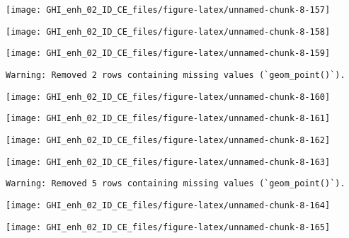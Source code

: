 \documentclass[
  10pt,
  a4paper,oneside]{article}
\begin{document}
\begin{center}\texttt{[image: GHI\_enh\_02\_ID\_CE\_files/figure-latex/unnamed-chunk-8-157]} \end{center}

\begin{center}\texttt{[image: GHI\_enh\_02\_ID\_CE\_files/figure-latex/unnamed-chunk-8-158]} \end{center}

\begin{center}\texttt{[image: GHI\_enh\_02\_ID\_CE\_files/figure-latex/unnamed-chunk-8-159]} \end{center}

\begin{verbatim}
Warning: Removed 2 rows containing missing values (`geom_point()`).
\end{verbatim}

\begin{center}\texttt{[image: GHI\_enh\_02\_ID\_CE\_files/figure-latex/unnamed-chunk-8-160]} \end{center}

\begin{center}\texttt{[image: GHI\_enh\_02\_ID\_CE\_files/figure-latex/unnamed-chunk-8-161]} \end{center}

\begin{center}\texttt{[image: GHI\_enh\_02\_ID\_CE\_files/figure-latex/unnamed-chunk-8-162]} \end{center}

\begin{center}\texttt{[image: GHI\_enh\_02\_ID\_CE\_files/figure-latex/unnamed-chunk-8-163]} \end{center}

\begin{verbatim}
Warning: Removed 5 rows containing missing values (`geom_point()`).
\end{verbatim}

\begin{center}\texttt{[image: GHI\_enh\_02\_ID\_CE\_files/figure-latex/unnamed-chunk-8-164]} \end{center}

\begin{center}\texttt{[image: GHI\_enh\_02\_ID\_CE\_files/figure-latex/unnamed-chunk-8-165]} \end{center}
\end{document}
